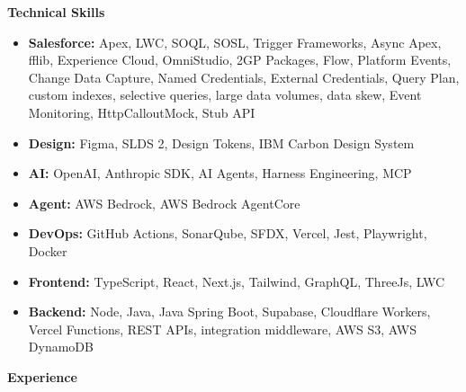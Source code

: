 \documentclass[10pt]{article}
\newcommand{\cvsection}[1]
{
	\begin{center}
		\large\textcolor{sectcol}{\textbf{#1}}
	\end{center}
}
\begin{document}
\cvsection{Technical Skills}
\vspace{-10pt}
\begin{itemize}
\item \textbf{Salesforce:} Apex, LWC, SOQL, SOSL, Trigger Frameworks, Async Apex, fflib, Experience Cloud, OmniStudio, 2GP Packages, Flow, Platform Events, Change Data Capture, Named Credentials, External Credentials, Query Plan, custom indexes, selective queries, large data volumes, data skew, Event Monitoring, HttpCalloutMock, Stub API
\item \textbf{Design:} Figma, SLDS 2, Design Tokens, IBM Carbon Design System
\item \textbf{AI:} OpenAI, Anthropic SDK, AI Agents, Harness Engineering, MCP
\item \textbf{Agent:} AWS Bedrock, AWS Bedrock AgentCore
\item \textbf{DevOps:} GitHub Actions, SonarQube, SFDX, Vercel, Jest, Playwright, Docker
\item \textbf{Frontend:} TypeScript, React, Next.js, Tailwind, GraphQL, ThreeJs, LWC
\item \textbf{Backend:} Node, Java, Java Spring Boot, Supabase, Cloudflare Workers, Vercel Functions, REST APIs, integration middleware, AWS S3, AWS DynamoDB
\end{itemize}

\cvsection{Experience}
\end{document}
